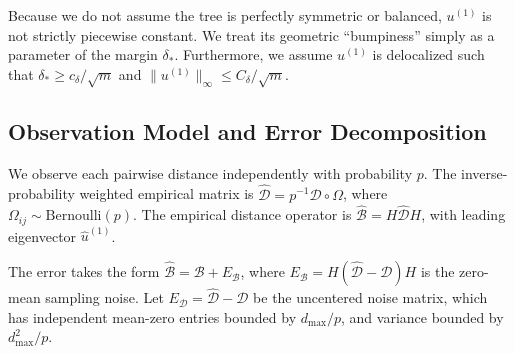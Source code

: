 \documentclass[11pt]{article}
\begin{document}
Because we do not assume the tree is perfectly symmetric or balanced, $u^{(1)}$ is not strictly piecewise constant. We treat its geometric ``bumpiness'' simply as a parameter of the margin $\delta_*$. Furthermore, we assume $u^{(1)}$ is delocalized such that $\delta_* \ge c_\delta / \sqrt{m}$ and $\|u^{(1)}\|_\infty \le C_\delta / \sqrt{m}$.

\subsection{Observation Model and Error Decomposition}

We observe each pairwise distance independently with probability $p$. The inverse-probability weighted empirical matrix is $\hat{\mathcal{D}} = p^{-1} \mathcal{D} \circ \Omega$, where $\Omega_{ij} \sim \text{Bernoulli}(p)$. The empirical distance operator is $\hat{\mathcal{B}} = H\hat{\mathcal{D}}H$, with leading eigenvector $\hat{u}^{(1)}$. 

The error takes the form $\hat{\mathcal{B}} = \mathcal{B} + E_{\mathcal{B}}$, where $E_{\mathcal{B}} = H(\hat{\mathcal{D}} - \mathcal{D})H$ is the zero-mean sampling noise. Let $E_{\mathcal{D}} = \hat{\mathcal{D}} - \mathcal{D}$ be the uncentered noise matrix, which has independent mean-zero entries bounded by $d_{\max}/p$, and variance bounded by $d_{\max}^2/p$.
\end{document}
